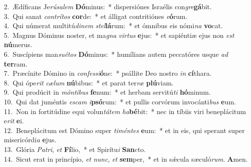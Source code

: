{2.~}Ædíficans Je\textit{rú}\textit{sa}\textit{lem} \textbf{Dó}minus:~* dispersiónes Israélis con\textit{gre}\textbf{gá}bit.\\
{3.~}Qui sanat \textit{con}\textit{trí}\textit{tos} \textbf{cor}de:~* et álligat contritiónes \textit{e}\textbf{ó}rum.\\
{4.~}Qui númerat multitú\textit{di}\textit{nem} \textit{stel}\textbf{lá}rum:~* et ómnibus eis nómi\textit{na} \textbf{vo}cat.\\
{5.~}Magnus Dóminus noster, et ma\textit{gna} \textit{vir}\textit{tus} \textbf{e}jus:~* et sapiéntiæ ejus non \textit{est} \textbf{nú}merus.\\
{6.~}Suscípiens man\textit{su}\textit{é}\textit{tos} \textbf{Dó}minus:~* humílians autem peccatóres usque \textit{ad} \textbf{ter}ram.\\
{7.~}Præcínite Dómino in \textit{con}\textit{fes}\textit{si}\textbf{ó}ne:~* psállite Deo nostro \textit{in} \textbf{cí}thara.\\
{8.~}Qui ópe\textit{rit} \textit{cæ}\textit{lum} \textbf{nú}bibus:~* et parat ter\textit{ræ} \textbf{plú}viam.\\
{9.~}Qui prodúcit in \textit{món}\textit{ti}\textit{bus} \textbf{fe}num:~* et herbam servitú\textit{ti} \textbf{hó}minum.\\
{10.~}Qui dat juméntis \textit{e}\textit{scam} \textit{i}\textbf{psó}rum:~* et pullis corvórum invocánti\textit{bus} \textbf{e}um.\\
{11.~}Non in fortitúdine equi volun\textit{tá}\textit{tem} \textit{ha}\textbf{bé}bit:~* nec in tíbiis viri beneplácitum e\textit{rit} \textbf{e}i.\\
{12.~}Beneplácitum est Dómino super \textit{ti}\textit{mén}\textit{tes} \textbf{e}um:~* et in eis, qui sperant super misericórdi\textit{a} \textbf{e}jus.\\
{13.~}Glória \textit{Pa}\textit{tri}, \textit{et} \textbf{Fí}lio,~* et Spirítu\textit{i} \textbf{San}cto.\\
{14.~}Sicut erat in princípio, \textit{et} \textit{nunc}, \textit{et} \textbf{sem}per,~* et in sǽcula sæculó\textit{rum}. \textbf{A}men.\\
